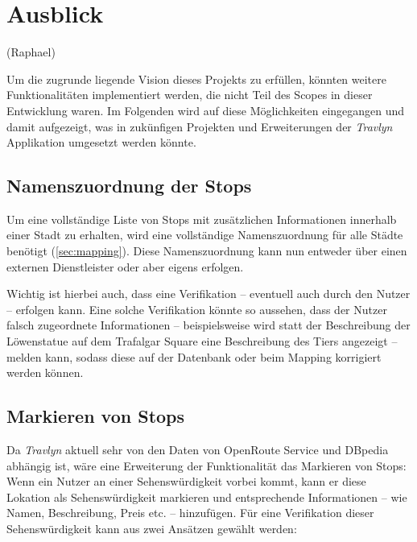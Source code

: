 \chapter{Ausblick}

	(Raphael)

	Um die zugrunde liegende Vision dieses Projekts zu erfüllen, könnten weitere Funktionalitäten implementiert werden, die nicht Teil des Scopes in dieser Entwicklung waren. Im Folgenden wird auf diese Möglichkeiten eingegangen und damit aufgezeigt, was in zukünfigen Projekten und Erweiterungen der \textit{Travlyn} Applikation umgesetzt werden könnte.
	
	\section{Namenszuordnung der Stops}
	
		Um eine vollständige Liste von Stops mit zusätzlichen Informationen innerhalb einer Stadt zu erhalten, wird eine vollständige Namenszuordnung für alle Städte benötigt (\autoref{sec:mapping}). Diese Namenszuordnung kann nun entweder über einen externen Dienstleister oder aber eigens erfolgen. 
		
		Wichtig ist hierbei auch, dass eine Verifikation -- eventuell auch durch den Nutzer -- erfolgen kann. Eine solche Verifikation könnte so aussehen, dass der Nutzer falsch zugeordnete Informationen -- beispielsweise wird statt der Beschreibung der Löwenstatue auf dem Trafalgar Square eine Beschreibung des Tiers angezeigt -- melden kann, sodass diese auf der Datenbank oder beim Mapping korrigiert werden können. 
		
	\section{Markieren von Stops}
	
		Da \textit{Travlyn} aktuell sehr von den Daten von OpenRoute Service und DBpedia abhängig ist, wäre eine Erweiterung der Funktionalität das Markieren von Stops: Wenn ein Nutzer an einer Sehenswürdigkeit vorbei kommt, kann er diese Lokation als Sehenswürdigkeit markieren und entsprechende Informationen -- wie Namen, Beschreibung, Preis etc. -- hinzufügen. Für eine Verifikation dieser Sehenswürdigkeit kann aus zwei Ansätzen gewählt werden: 
		
